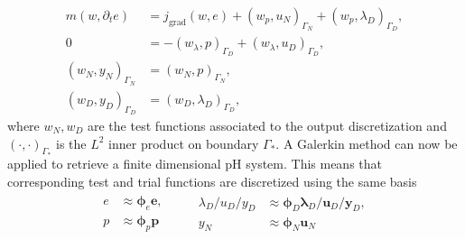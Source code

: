 \documentclass{ifacconf}
\begin{document}
\begin{equation}
\begin{aligned}
m(w, \partial_t{e}) &= j_{\text{grad}}(w, e) + \left(w_p, u_N \right)_{\Gamma_N} + \left(w_p, \lambda_D \right)_{\Gamma_D}, \\
0 &= - \left(w_\lambda, p \right)_{\Gamma_D} + \left(w_\lambda, u_D \right)_{\Gamma_D}, \\
\left(w_N, y_N \right)_{\Gamma_N} &= \left(w_N, p \right)_{\Gamma_N}, \\
\left(w_D, y_D \right)_{\Gamma_D} &= \left(w_D, \lambda_D \right)_{\Gamma_D}, 
\end{aligned}
\end{equation}
where $w_N, w_D$ are the test functions associated to the output discretization and $\left( \cdot, \cdot \right)_{\Gamma_{*}}$ is the $L^2$ inner product on boundary $\Gamma_*$. A Galerkin method can now be applied to retrieve a finite dimensional pH system. This means that corresponding test and trial functions are discretized using the same basis
\begin{align*}
\begin{aligned}
e &\approx \bm\phi_e \mathbf{e}, \\
p &\approx \bm\phi_p \mathbf{p}
\end{aligned} \qquad
\begin{aligned}
\lambda_D/u_D/y_D &\approx \bm\phi_D \bm{\lambda}_D/\mathbf{u}_D/\mathbf{y}_D, \\
y_N &\approx \bm\phi_N \mathbf{u}_N
\end{aligned}
\end{align*}
\end{document}
